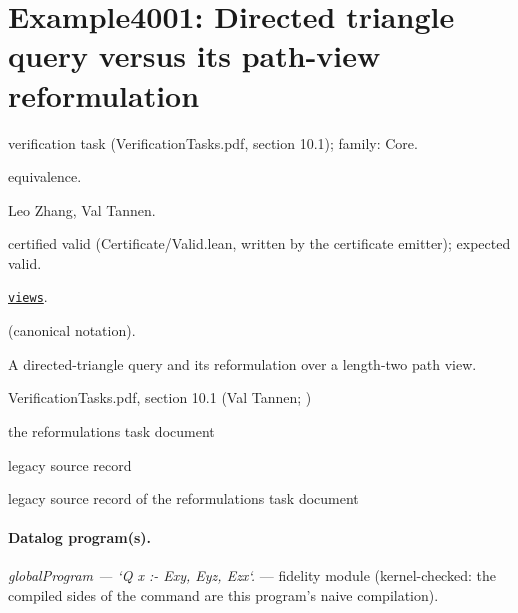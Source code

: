 \documentclass[10pt]{article}
\begin{document}
\Needspace{0.45\textheight}

\section{Example4001: Directed triangle query versus its path-view reformulation}\label{case:Example4001}

\begin{description}[leftmargin=2.6cm,style=nextline,itemsep=1pt]

\item[Category] verification task (VerificationTasks.pdf, section 10.1); family: Core.

\item[Kind] equivalence.

\item[Contributors] Leo Zhang, Val Tannen.

\item[Status] certified valid (Certificate/Valid.lean, written by the certificate emitter); expected valid.

\item[Tags] \hyperref[tag:views]{\texttt{views}}.

\item[Input]  (canonical notation).

\item[Summary] A directed-triangle query and its reformulation over a length-two path view.

\item[Sources] {\raggedright VerificationTasks.pdf, section 10.1 (Val Tannen; ) \par the reformulations task document \par legacy source record  \par legacy source record of the reformulations task document\par}

\end{description}

\paragraph{Datalog program(s).}

{\raggedright\textit{globalProgram --- `Q x :- Exy, Eyz, Ezx`.} --- fidelity module (kernel-checked: the compiled sides of the command are this program's naive compilation).\par}
\end{document}
